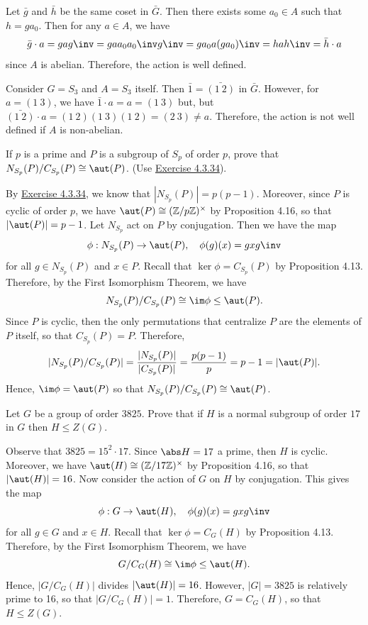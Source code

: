 \begin{sol}
	Let $\bar g$ and $\bar h$ be the same coset in $\bar G$. Then there exists some $a_0 \in A$ such that $h = ga_0$. Then for any $a \in A$, we have
	\[\bar g \cdot a = gag\inv = ga a_0a_0\inv g\inv = ga_0a(ga_0)\inv = hah\inv = \bar h \cdot a\]
	since $A$ is abelian. Therefore, the action is well defined.

	Consider $G = S_3$ and $A = S_3$ itself. Then $\bar 1 = \bar{(1\ 2)}$ in $\bar G$. However, for $a = (1\ 3)$, we have $\bar 1 \cdot a = a = (1\ 3)$ but, but $\bar{(1\ 2)} \cdot a = (1\ 2)(1\ 3)(1\ 2) = (2\ 3) \neq a$. Therefore, the action is not well defined if $A$ is non-abelian.
\end{sol}

\begin{exercise}
	If $p$ is a prime and $P$ is a subgroup of $S_p$ of order $p$, prove that $N_{S_p}(P)/C_{S_p}(P) \cong \aut(P)$. (Use \hyperref[ex4.3.34]{Exercise 4.3.34}).
\end{exercise}

\begin{sol}
	By \hyperref[ex4.3.34]{Exercise 4.3.34}, we know that $|N_{S_p}(P)| = p(p - 1)$. Moreover, since $P$ is cyclic of order $p$, we have $\aut(P) \cong (\mathbb Z/p\mathbb Z)^\times$ by Proposition 4.16, so that $|\aut(P)| = p - 1$. Let $N_{S_p}$ act on $P$ by conjugation. Then we have the map
	\[\phi : N_{S_p}(P) \to \aut(P), \quad \phi(g)(x) = gxg\inv\]
	for all $g \in N_{S_p}(P)$ and $x \in P$. Recall that $\ker\phi = C_{S_p}(P)$ by Proposition 4.13. Therefore, by the First Isomorphism Theorem, we have
	\[N_{S_p}(P)/C_{S_p}(P) \cong \im\phi \leq \aut(P).\]
	Since $P$ is cyclic, then the only permutations that centralize $P$ are the elements of $P$ itself, so that $C_{S_p}(P) = P$. Therefore,
	\[|N_{S_p}(P)/C_{S_p}(P)| = \frac{|N_{S_p}(P)|}{|C_{S_p}(P)|} = \frac{p(p - 1)}{p} = p - 1 = |\aut(P)|.\]
	Hence, $\im\phi = \aut(P)$ so that $N_{S_p}(P)/C_{S_p}(P) \cong \aut(P)$.
\end{sol}

\begin{exercise}
	Let $G$ be a group of order $3825$. Prove that if $H$ is a normal subgroup of order $17$ in $G$ then $H \le Z(G)$.
\end{exercise}

\begin{sol}
	Observe that $3825 = 15^2 \cdot 17$. Since $\abs H = 17$ a prime, then $H$ is cyclic. Moreover, we have $\aut(H) \cong (\mathbb Z/17\mathbb Z)^\times$ by Proposition 4.16, so that $|\aut(H)| = 16$. Now consider the action of $G$ on $H$ by conjugation. This gives the map
	\[\phi : G \to \aut(H), \quad \phi(g)(x) = gxg\inv\]
	for all $g \in G$ and $x \in H$. Recall that $\ker\phi = C_G(H)$ by Proposition 4.13. Therefore, by the First Isomorphism Theorem, we have
	\[G/C_G(H) \cong \im\phi \leq \aut(H).\]
	Hence, $|G/C_G(H)|$ divides $|\aut(H)| = 16$. However, $|G| = 3825$ is relatively prime to 16, so that $|G/C_G(H)| = 1$. Therefore, $G = C_G(H)$, so that $H \leq Z(G)$.
\end{sol}

